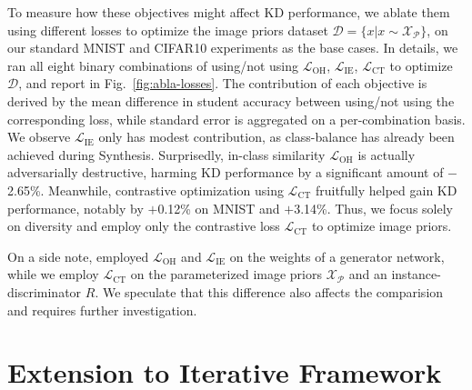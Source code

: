 \begin{foldable} %
    To measure how these objectives might affect KD performance, we ablate them using different losses to optimize the image priors dataset $\mathcal{D} = \{x | x \sim \mathcal{X}_\mathcal{P}\}$, on our standard MNIST and CIFAR10 experiments as the base cases.
    In details, we ran all eight binary combinations of using/not using $\mathcal{L}_{\text{OH}}$, $\mathcal{L}_{\text{IE}}$, $\mathcal{L}_{\text{CT}}$ to optimize $\mathcal{D}$, and report in Fig.~\ref{fig:abla-losses}.
    The contribution of each objective is derived by the mean difference in student accuracy between using/not using the corresponding loss, while standard error is aggregated on a per-combination basis.
    We observe $\mathcal{L}_{\text{IE}}$ only has modest contribution, as class-balance has already been achieved during Synthesis.
    Surprisedly, in-class similarity $\mathcal{L}_{\text{OH}}$ is actually adversarially destructive, harming KD performance by a significant amount of $-$2.65\%.
    Meanwhile, contrastive optimization using $\mathcal{L}_{\text{CT}}$ fruitfully helped gain KD performance, notably by $+$0.12\% on MNIST and $+$3.14\%.
    Thus, we focus solely on diversity and employ only the contrastive loss $\mathcal{L}_{\text{CT}}$ to optimize image priors.
\end{foldable}

\begin{foldable} %
    On a side note, \citet{zhang2022ideal, yuan2024data} employed $\mathcal{L}_{\text{OH}}$ and $\mathcal{L}_{\text{IE}}$ on the weights of a generator network, while we employ $\mathcal{L}_{\text{CT}}$ on the parameterized image priors $\mathcal{X}_{\mathcal{P}}$ and an instance-discriminator $R$.
    We speculate that this difference also affects the comparision and requires further investigation.
\end{foldable}



\section{Extension to Iterative Framework} \label{sec:app03-extension}
\renewcommand{\thefigure}{C.\arabic{figure}}
\renewcommand{\thetable}{C.\arabic{table}}
\renewcommand{\theequation}{C.\arabic{equation}}
\setcounter{figure}{0}
\setcounter{table}{0}
\setcounter{equation}{0}


